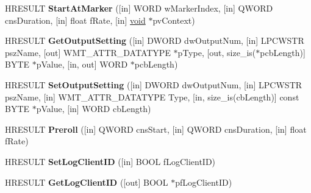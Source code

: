 \begin{DoxyCompactItemize}
\item 
\mbox{\label{interface_i_w_m_reader_advanced2_ada73703920ca8dccb22f41ac3b77d3fb}} 
H\+R\+E\+S\+U\+LT {\bfseries Start\+At\+Marker} (\mbox{[}in\mbox{]} W\+O\+RD w\+Marker\+Index, \mbox{[}in\mbox{]} Q\+W\+O\+RD cns\+Duration, \mbox{[}in\mbox{]} float f\+Rate, \mbox{[}in\mbox{]} \hyperlink{interfacevoid}{void} $\ast$pv\+Context)
\item 
\mbox{\label{interface_i_w_m_reader_advanced2_a2adf88a7ac16e66e4cb3a7626a00726d}} 
H\+R\+E\+S\+U\+LT {\bfseries Get\+Output\+Setting} (\mbox{[}in\mbox{]} D\+W\+O\+RD dw\+Output\+Num, \mbox{[}in\mbox{]} L\+P\+C\+W\+S\+TR psz\+Name, \mbox{[}out\mbox{]} W\+M\+T\+\_\+\+A\+T\+T\+R\+\_\+\+D\+A\+T\+A\+T\+Y\+PE $\ast$p\+Type, \mbox{[}out, size\+\_\+is($\ast$pcb\+Length)\mbox{]} B\+Y\+TE $\ast$p\+Value, \mbox{[}in, out\mbox{]} W\+O\+RD $\ast$pcb\+Length)
\item 
\mbox{\label{interface_i_w_m_reader_advanced2_a01faba0c6c78a5cb32e9a50d187d13be}} 
H\+R\+E\+S\+U\+LT {\bfseries Set\+Output\+Setting} (\mbox{[}in\mbox{]} D\+W\+O\+RD dw\+Output\+Num, \mbox{[}in\mbox{]} L\+P\+C\+W\+S\+TR psz\+Name, \mbox{[}in\mbox{]} W\+M\+T\+\_\+\+A\+T\+T\+R\+\_\+\+D\+A\+T\+A\+T\+Y\+PE Type, \mbox{[}in, size\+\_\+is(cb\+Length)\mbox{]} const B\+Y\+TE $\ast$p\+Value, \mbox{[}in\mbox{]} W\+O\+RD cb\+Length)
\item 
\mbox{\label{interface_i_w_m_reader_advanced2_abe3a31dd820ac9e012d2d919f9f94808}} 
H\+R\+E\+S\+U\+LT {\bfseries Preroll} (\mbox{[}in\mbox{]} Q\+W\+O\+RD cns\+Start, \mbox{[}in\mbox{]} Q\+W\+O\+RD cns\+Duration, \mbox{[}in\mbox{]} float f\+Rate)
\item 
\mbox{\label{interface_i_w_m_reader_advanced2_ae12c7e007e911907c424d7be02cd5697}} 
H\+R\+E\+S\+U\+LT {\bfseries Set\+Log\+Client\+ID} (\mbox{[}in\mbox{]} B\+O\+OL f\+Log\+Client\+ID)
\item 
\mbox{\label{interface_i_w_m_reader_advanced2_ab1c1360803532b0df971401bd42aeb2b}} 
H\+R\+E\+S\+U\+LT {\bfseries Get\+Log\+Client\+ID} (\mbox{[}out\mbox{]} B\+O\+OL $\ast$pf\+Log\+Client\+ID)
\item 

\end{DoxyCompactItemize}
